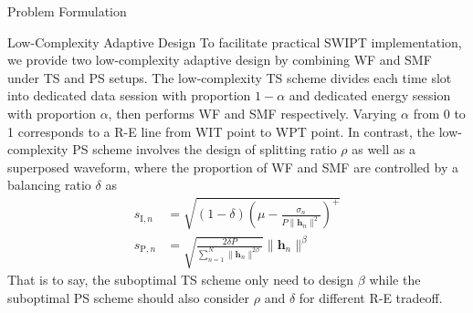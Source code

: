 \documentclass[journal]{IEEEtran}
\begin{document}
\begin{section}{Problem Formulation}
\begin{subsection}{Low-Complexity Adaptive Design}
			To facilitate practical SWIPT implementation, we provide two low-complexity adaptive design by combining WF and SMF under TS and PS setups.	The low-complexity TS scheme divides each time slot into dedicated data session with proportion $1 - \alpha$ and dedicated energy session with proportion $\alpha$, then performs WF and SMF respectively. Varying $\alpha$ from \num{0} to \num{1} corresponds to a R-E line from WIT point to WPT point. In contrast, the low-complexity PS scheme involves the design of splitting ratio $\rho$ as well as a superposed waveform, where the proportion of WF and SMF are controlled by a balancing ratio $\delta$ as
			\begin{align}
				s_{\mathrm{I}, n} &= \sqrt{(1 - \delta)\left(\mu - \frac{\sigma_n}{P \lVert{\boldsymbol{h}_n}\rVert^2}\right)^+} \\
				s_{\mathrm{P}, n} &= \sqrt{\frac{2 \delta P}{\sum_{n=1}^N \lVert{\boldsymbol{h}_n \rVert^{2 \beta}}}}\lVert{\boldsymbol{h}_n}\rVert^\beta
			\end{align}
			That is to say, the suboptimal TS scheme only need to design $\beta$ while the suboptimal PS scheme should also consider $\rho$ and $\delta$ for different R-E tradeoff.
		\end{subsection}
	\end{section}
\end{document}
